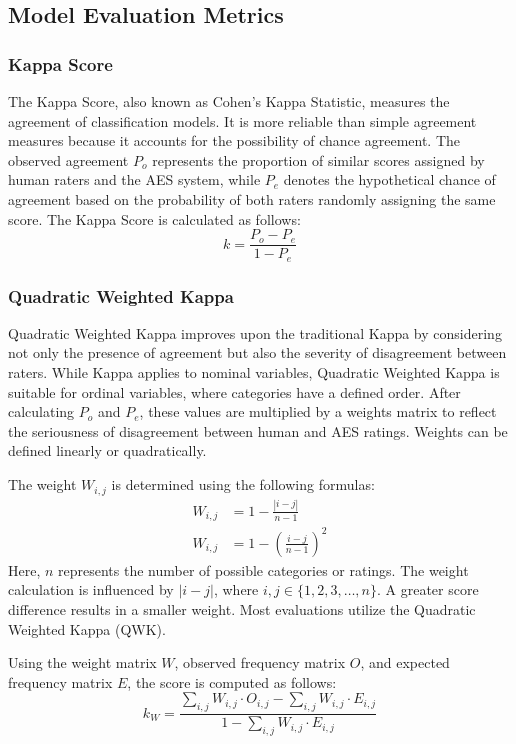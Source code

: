 \documentclass{article}
\begin{document}
	\subsection{Model Evaluation Metrics} 
	
	\subsubsection*{Kappa Score}
	The Kappa Score, also known as Cohen's Kappa Statistic, measures the agreement of classification models. It is more reliable than simple agreement measures because it accounts for the possibility of chance agreement. The observed agreement \( P_o \) represents the proportion of similar scores assigned by human raters and the AES system, while \( P_e \) denotes the hypothetical chance of agreement based on the probability of both raters randomly assigning the same score. The Kappa Score is calculated as follows:
	$$ k = \frac{P_o - P_e}{1 - P_e} $$
	
	\subsubsection*{Quadratic Weighted Kappa}
	Quadratic Weighted Kappa improves upon the traditional Kappa by considering not only the presence of agreement but also the severity of disagreement between raters. While Kappa applies to nominal variables, Quadratic Weighted Kappa is suitable for ordinal variables, where categories have a defined order. After calculating \( P_o \) and \( P_e \), these values are multiplied by a weights matrix to reflect the seriousness of disagreement between human and AES ratings. Weights can be defined linearly or quadratically. 
	
	The weight \( W_{i,j} \) is determined using the following formulas:
	\begin{align*}
		W_{i,j} &= 1 - \frac{|i - j|}{n - 1} \\
		W_{i,j} &= 1 - \left( \frac{i - j}{n - 1} \right) ^2
	\end{align*}
	Here, \( n \) represents the number of possible categories or ratings. The weight calculation is influenced by \( |i - j| \), where \( i,j \in \{ 1, 2, 3, \ldots, n \} \). A greater score difference results in a smaller weight. Most evaluations utilize the Quadratic Weighted Kappa (QWK).
	
	Using the weight matrix \( W \), observed frequency matrix \( O \), and expected frequency matrix \( E \), the score is computed as follows:
	$$ k_W = \frac{\sum_{i,j} W_{i,j} \cdot O_{i,j} - \sum_{i,j} W_{i,j} \cdot E_{i,j}}{1 - \sum_{i,j} W_{i,j} \cdot E_{i,j}} $$
	
\end{document}
